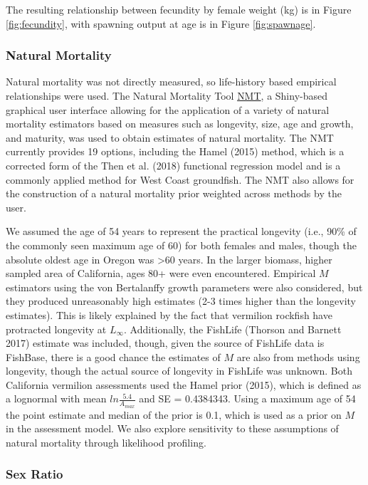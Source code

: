 \documentclass[
  english,
  a4paper,
]{article}
\begin{document}
The resulting relationship between fecundity by female weight (kg) is in Figure \ref{fig:fecundity}, with spawning output at age is in Figure \ref{fig:spawnage}.

\hypertarget{natural-mortality}{%
\subsubsection{Natural Mortality}\label{natural-mortality}}

Natural mortality was not directly measured, so life-history based empirical
relationships were used. The Natural Mortality Tool
\href{https://github.com/shcaba/Natural-Mortality-Tool}{NMT}, a Shiny-based
graphical user interface allowing for the application of a variety of natural
mortality estimators based on measures such as longevity, size, age and growth,
and maturity, was used to obtain estimates of natural mortality. The NMT currently
provides 19 options, including the Hamel (2015) method, which is a corrected
form of the Then et al. (2018) functional regression model and is a commonly
applied method for West Coast groundfish. The NMT also allows for the construction
of a natural mortality prior weighted across methods by the user.

We assumed the age of 54 years to represent the practical longevity (i.e., 90\% of
the commonly seen maximum age of 60) for both females and males, though the absolute
oldest age in Oregon was \textgreater60 years. In the larger biomass, higher sampled area of
California, ages 80+ were even encountered. Empirical \(M\) estimators using the von
Bertalanffy growth parameters were also considered, but they produced unreasonably
high estimates (2-3 times higher than the longevity estimates). This is likely
explained by the fact that vermilion rockfish have protracted longevity at \(L_{\infty}\).
Additionally, the FishLife (Thorson and Barnett 2017) estimate was included, though, given
the source of FishLife data is FishBase, there is a good chance the estimates of
\(M\) are also from methods using longevity, though the actual source of longevity
in FishLife was unknown.
Both California vermilion assessments used the Hamel prior (2015), which
is defined as a lognormal with mean \(ln\frac{5.4}{A_{max}}\) and SE = 0.4384343.
Using a maximum age of 54 the point estimate and median of the prior is 0.1, which
is used as a prior on \(M\) in the assessment model. We also explore sensitivity to
these assumptions of natural mortality through likelihood profiling.

\hypertarget{sex-ratio}{%
\subsubsection{Sex Ratio}\label{sex-ratio}}
\end{document}
